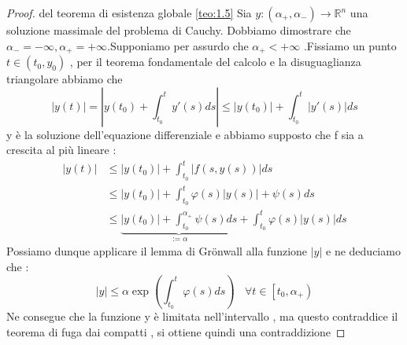 \documentclass{article}
\theoremstyle{definition}
\newcommand{\R}{\mathbb{R}}
\newcommand{\Rn}{\R^n}
\newcommand{\norm}[1]{|#1|}
\begin{document}
 \begin{proof} del teorema di  esistenza globale \ref{teo:1.5} \newline
Sia $y: (\alpha_+,\alpha_-)\rightarrow \Rn$ una soluzione massimale del problema di Cauchy. Dobbiamo dimostrare che $\alpha_-=-\infty , \alpha_+=+\infty$.Supponiamo per assurdo che $\alpha_+ < +\infty$ .Fissiamo un punto $ t \in (t_0,y_0)$ , per il teorema fondamentale del calcolo e la disuguaglianza triangolare abbiamo che 
$$|y(t)|=\left|y(t_0)+\int_{t_0}^{t} y'(s)ds\right|  \leq |y(t_0)|+ \int_{t_0}^{t}|y'(s)|ds$$
y è la soluzione dell'equazione differenziale e abbiamo supposto che f sia a crescita al più lineare : 
\begin{align*}
	\norm{y(t)}&\leq \norm{y(t_0)}+ \int_{t_0}^{t}\norm{f(s,y(s))}ds \\
	&\leq \norm{y(t_0)}+ \int_{t_0}^{t} \varphi(s)|y(s)|+\psi(s)ds\\
	&\leq  \underbrace{\norm{y(t_0)}+ \int_{t_0}^{\alpha_+} \psi (s)ds}_{:=\alpha} + \int_{t_0}^{t} \varphi (s)\norm{y(s)}ds
\end{align*}
Possiamo dunque applicare il lemma di Grönwall alla funzione $\norm{y}$ e ne deduciamo che :
$$\norm{y}\leq \alpha \exp \left(\int_{t_0}^{t}\varphi(s)ds\right) \ \ \ \ \forall t \in \left[t_0,\alpha_+\right)$$
Ne consegue che la funzione y è limitata nell'intervallo , ma questo contraddice il teorema di fuga dai compatti , si ottiene quindi una contraddizione 
 \end{proof}
\end{document}
